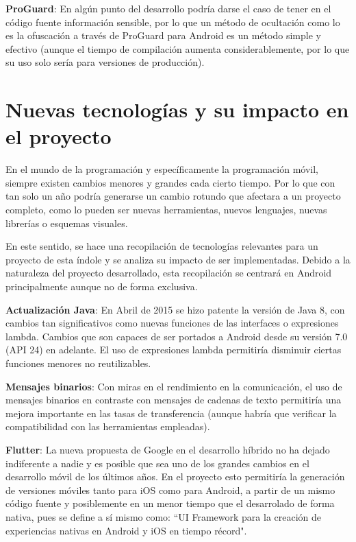 \textbf{ProGuard}\cite{proguard}: En algún punto del desarrollo podría darse el caso de tener en el código fuente información sensible, por lo que un método de ocultación como lo es la ofuscación a través de ProGuard para Android es un método simple y efectivo (aunque el tiempo de compilación aumenta considerablemente, por lo que su uso solo sería para versiones de producción).

\newpage

\section{Nuevas tecnologías y su impacto en el proyecto}

En el mundo de la programación y específicamente la programación móvil, siempre existen cambios menores y grandes cada cierto tiempo. Por lo que con tan solo un año podría generarse un cambio rotundo que afectara a un proyecto completo, como lo pueden ser nuevas herramientas, nuevos lenguajes, nuevas librerías o esquemas visuales.

En este sentido, se hace una recopilación de tecnologías relevantes para un proyecto de esta índole y se analiza su impacto de ser implementadas. Debido a la naturaleza del proyecto desarrollado, esta recopilación se centrará en Android principalmente aunque no de forma exclusiva.

\textbf{Actualización Java}\cite{java8}: En Abril de 2015 se hizo patente la versión de Java 8, con cambios tan significativos como nuevas funciones de las interfaces o expresiones lambda. Cambios que son capaces de ser portados a Android desde su versión 7.0 (API 24) en adelante. El uso de expresiones lambda permitiría disminuir ciertas funciones menores no reutilizables.

\textbf{Mensajes binarios}: Con miras en el rendimiento en la comunicación, el uso de mensajes binarios en contraste con mensajes de cadenas de texto permitiría una mejora importante en las tasas de transferencia (aunque habría que verificar la compatibilidad con las herramientas empleadas).

\textbf{Flutter}\cite{flutter}: La nueva propuesta de Google en el desarrollo híbrido no ha dejado indiferente a nadie y es posible que sea uno de los grandes cambios en el desarrollo móvil de los últimos años. En el proyecto esto permitiría la generación de versiones móviles tanto para iOS como para Android, a partir de un mismo código fuente y posiblemente en un menor tiempo que el desarrolado de forma nativa, pues se define a sí mismo como: ``UI Framework para la creación de experiencias nativas en Android y iOS en tiempo récord".

